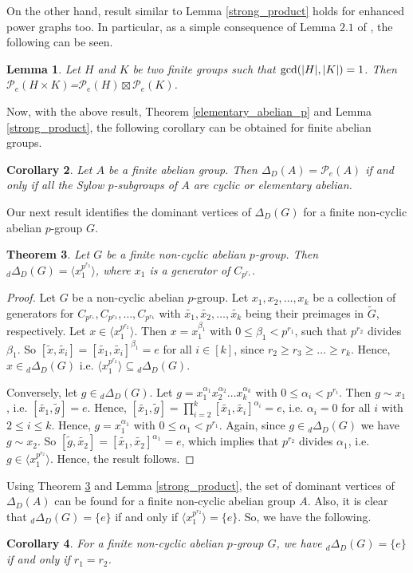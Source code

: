 \documentclass[12pt,a4paper]{article}
\newtheorem{theorem}{Theorem}[section]
\newtheorem{lemma}[theorem]{Lemma}
\newtheorem{corollary}[theorem]{Corollary}
\begin{document}
On the other hand, result similar to Lemma \ref{strong_product} holds for enhanced power graphs too. In particular, as a simple consequence of Lemma $2.1$ of \cite{zahirovic}, the following can be seen. 
\begin{lemma}\label{tensor_ep}
Let $H$ and $K$ be two finite groups such that ${\rm gcd}(|H|,|K|)=1$. Then $\mathcal{P}_e(H\times K)$=$\mathcal{P}_e(H)\boxtimes\mathcal{P}_e(K)$.   
\end{lemma}
Now, with the above result, Theorem \ref{elementary_abelian_p} and Lemma \ref{strong_product}, the following corollary can be obtained for finite abelian groups. 
\begin{corollary}
Let $A$ be a finite abelian group. Then $\Delta_D(A)=\mathcal{P}_e(A)$ if and only if all the Sylow $p$-subgroups of $A$ are cyclic or elementary abelian. 
\end{corollary}
Our next result identifies the dominant vertices of $\Delta_D(G)$ for a finite non-cyclic abelian $p$-group $G$.
\begin{theorem}\label{dominant_abelian_p}
Let $G$ be a finite non-cyclic abelian $p$-group. Then $_d\Delta_D(G)=\langle x_1^{p^{r_2}}\rangle$, where  $x_1$  is a generator of $C_{p^{r_1}}$.
\end{theorem}
\begin{proof}
Let $G$ be a non-cyclic abelian $p$-group. Let $x_1,x_2,\dots, x_k$ be a collection of generators for $C_{p^{r_1}},C_{p^{r_2}},\dots,C_{p^{r_k}}$ with $\tilde{x_1},\tilde{x_2},\dots, \tilde{x_k}$ being their preimages in $\tilde{G}$, respectively. Let $x\in\langle x_1^{p^{r_2}}\rangle$. Then $x=x_1^{\beta_1}$ with $0\leq\beta_1<p^{r_1}$, such that $p^{r_2}$ divides $\beta_1$. So $[\tilde{x},\tilde{x_i}]=[\tilde{x_1},\tilde{x_i}]^{\beta_1}=e$ for all $i\in[k]$, since $r_2\geq r_3\geq\dots\geq r_k$. Hence, $x\in{_d}\Delta_D(G)$ i.e. $\langle x_1^{p^{r_2}}\rangle\subseteq{_d}\Delta_D(G)$. 

Conversely, let $g\in {_d}\Delta_D(G)$. Let $g=x_1^{\alpha_1}x_2^{\alpha_2}\dots x_k^{\alpha_k}$ with $0\leq\alpha_i<p^{r_i}$. Then $g\sim x_1$, i.e. $[\tilde{x_1},\tilde{g}]=e$. Hence, $[\tilde{x_1},\tilde{g}]=\prod_{i=2}^k[\tilde{x_1},\tilde{x_i}]^{\alpha_i}=e$, i.e. $\alpha_i=0$ for all $i$ with $2\leq i\leq k$. Hence, $g=x_1^{\alpha_1}$ with $0\leq \alpha_1<p^{r_1}$. Again, since $g\in {_d}\Delta_D(G)$ we have $g\sim x_2$. So $[\tilde{g},\tilde{x_2}]=[\tilde{x_1},\tilde{x_2}]^{\alpha_1}=e$, which implies that $p^{r_2}$ divides $\alpha_1$, i.e. $g\in\langle x_1^{p^{r_2}}\rangle$. Hence, the result follows.
\end{proof}
Using Theorem \ref{dominant_abelian_p} and Lemma \ref{strong_product}, the set of dominant vertices of $\Delta_D(A)$ can be found for a finite non-cyclic abelian group $A$. Also, it is clear that $_d\Delta_D(G)=\{e\}$ if and only if $\langle x_1^{p^{r_2}}\rangle=\{e\}$. So, we have the following.
\begin{corollary}
For a finite non-cyclic abelian $p$-group $G$, we have $_d\Delta_D(G)=\{e\}$ if  and only if $r_1=r_2$.  
\end{corollary}
\end{document}
